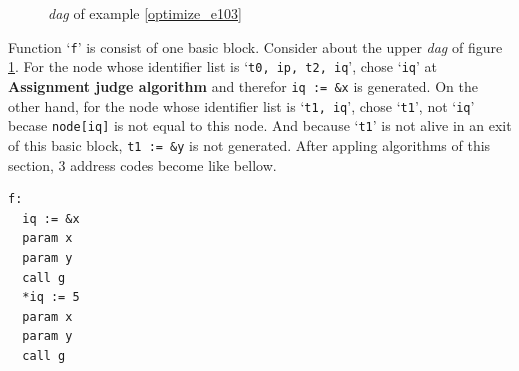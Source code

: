 \begin{Example}
\begin{figure}[htbp]
\begin{center}
\begin{latexonly}
\end{latexonly}
\caption{{\em dag} of example \ref{optimize_e103}}
\label{optimize_e104}
\end{center}
\end{figure}
Function `{\tt{f}}' is consist of one basic block.
Consider about the upper {\em dag} of figure \ref{optimize_e104}.
For the node whose identifier list is `{\tt{t0, ip, t2, iq}}',
chose `{\tt{iq}}' at {\bf Assignment judge algorithm} and
therefor {\tt{iq := \&x}} is generated.
On the other hand, for the node whose identifier list
is `{\tt{t1, iq}}', chose `{\tt{t1}}', not `{\tt{iq}}'
becase {\tt{node[iq]}} is not equal to this node. 
And because `{\tt{t1}}' is not alive in an exit of this basic
block, {\tt{t1 := \&y}} is not generated.
After appling algorithms of this section,
3 address codes become like bellow.
\begin{verbatim}
f:
  iq := &x
  param x
  param y
  call g
  *iq := 5
  param x
  param y
  call g
\end{verbatim}
\end{Example}

